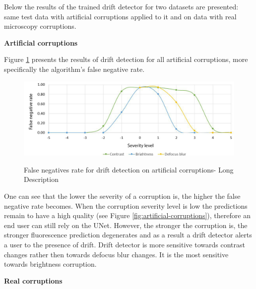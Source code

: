Below the results of the trained drift detector for two datasets are presented: same test data with artificial corruptions applied to it and on data with real microscopy corruptions. 

\textbf{Artificial corruptions}

Figure \ref{fig:fn-rate} presents the results of drift detection for all artificial corruptions, more specifically the algorithm's false negative rate.
\begin{figure}[H]
	\begin{center}
		\includegraphics[width=\linewidth]{bilder/drift-detection/fn-rate.png}
		\caption[False negatives rate for drift detection on artificial corruptions]%
		{False negatives rate for drift detection on artificial corruptions- Long Description}{}\label{fig:fn-rate}
	\end{center}
\end{figure}
One can see that the lower the severity of a corruption is, the higher the false negative rate becomes. When the corruption severity level is low the predictions remain to have a high quality (see Figure \ref{fig:artificial-corruptions}), therefore an end user can still rely on the UNet. However, the stronger the corruption is, the stronger fluorescence prediction degenerates and as a result a drift detector alerts a user to the presence of drift. Drift detector is more sensitive towards contrast changes rather then towards defocus blur changes. It is the most sensitive towards brightness corruption.

\textbf{Real corruptions}

